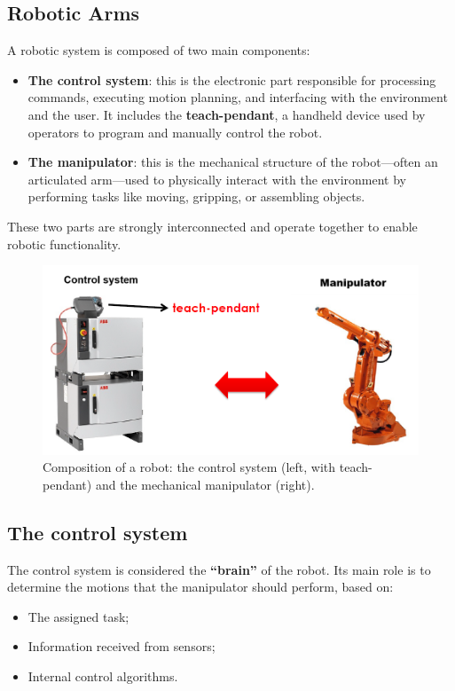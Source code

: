 \hfill

\subsection{Robotic Arms}

A robotic system is composed of two main components:

\begin{itemize}
  \item \textbf{The control system}: this is the electronic part responsible for processing commands, executing motion planning, and interfacing with the environment and the user. It includes the \textbf{teach-pendant}, a handheld device used by operators to program and manually control the robot.
  \item \textbf{The manipulator}: this is the mechanical structure of the robot—often an articulated arm—used to physically interact with the environment by performing tasks like moving, gripping, or assembling objects.
\end{itemize}

These two parts are strongly interconnected and operate together to enable robotic functionality.

\begin{figure}[H]
  \centering
  \includegraphics[width=0.7\linewidth]{imgs/robotic_arm_structure.png}
  \caption{Composition of a robot: the control system (left, with teach-pendant) and the mechanical manipulator (right).}
\end{figure}

\hfill

\subsection{The control system}

The control system is considered the \textbf{``brain''} of the robot. Its main role is to determine the motions that the manipulator should perform, based on:
\begin{itemize}
  \item The assigned task;
  \item Information received from sensors;
  \item Internal control algorithms.
\end{itemize}

